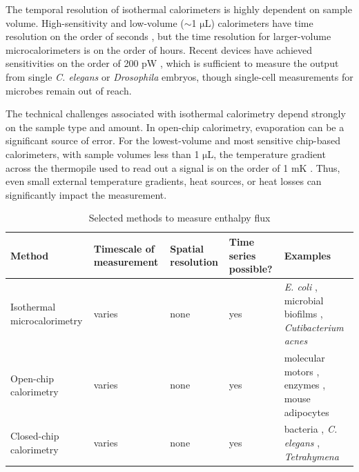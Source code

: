 \documentclass{compactarticle}
\begin{document}
The temporal resolution of isothermal calorimeters is highly dependent on sample volume. High-sensitivity and low-volume ($\sim$1 $\mathrm{\mu}$L) calorimeters have time resolution on the order of seconds \cite{bae_micromachined_2021,hong_sub-nanowatt_2020,hur_sub-nanowatt_2020}, but the time resolution for larger-volume microcalorimeters is on the order of hours.
Recent devices have achieved sensitivities on the order of 200 pW \cite{bae_micromachined_2021,hong_sub-nanowatt_2020,hur_sub-nanowatt_2020}, which is sufficient to measure the output from single \textit{C. elegans} or \textit{Drosophila} embryos, though single-cell measurements for microbes remain out of reach.

The technical challenges associated with isothermal calorimetry depend strongly on the sample type and amount. In open-chip calorimetry, evaporation can be a significant source of error. For the lowest-volume and most sensitive chip-based calorimeters, with sample volumes less than 1 $\mathrm{\mu}$L, the temperature gradient across the thermopile used to read out a signal is on the order of 1 mK \cite{bae_micromachined_2021}. Thus, even small external temperature gradients, heat sources, or heat losses can significantly impact the measurement.


\begin{table}[h]
\caption{Selected methods to measure enthalpy flux}
\label{tab:calorimetry}
\begin{center}

\begin{tabular}{|m{}|m{}|m{}|m{}|m{}|}
\hline
Method & Timescale of measurement & Spatial resolution & Time series possible? & Examples \\ \hline
Isothermal microcalorimetry & varies & none & yes & \textit{E. coli} \cite{braissant_use_2010}, microbial biofilms \cite{astasov-frauenhoffer_isothermal_2012}, \textit{Cutibacterium acnes} \cite{corvec_characterization_2020} \\ \hline
Open-chip calorimetry & varies & none & yes & molecular motors \cite{bae_micromachined_2021}, enzymes \cite{recht_enthalpy_2008}, mouse adipocytes \cite{johannessen_micromachined_2002} \\ \hline
Closed-chip calorimetry & varies & none & yes & bacteria \cite{morais_chip_2014}, \textit{C. elegans} \cite{hur_sub-nanowatt_2020}, \textit{Tetrahymena} \cite{hong_sub-nanowatt_2020} \\ \hline
\end{tabular}

\end{center}
\end{table}
\end{document}

